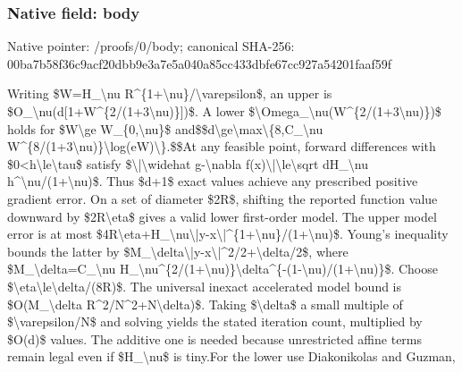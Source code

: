 \documentclass[10pt,a4paper]{article}
\begin{document}
\subsubsection{Native field: body}
Native pointer: /proofs/0/body; canonical SHA-256: 00ba7b58f36c9acf20dbb9e3a7e5a040a85cc433dbfe67cc927a54201faaf59f

\begingroup\raggedright\sloppy Writing \$W=\allowbreak{}H\_\allowbreak{}\textbackslash{}nu R\textasciicircum{}\{1+\textbackslash{}nu\}/\allowbreak{}\textbackslash{}varepsilon\$,\allowbreak{} an upper is \$O\_\allowbreak{}\textbackslash{}nu(d[1+W\textasciicircum{}\{2/\allowbreak{}(1+3\textbackslash{}nu)\}])\$. A lower \$\textbackslash{}Omega\_\allowbreak{}\textbackslash{}nu(W\textasciicircum{}\{2/\allowbreak{}(1+3\textbackslash{}nu)\})\$ holds for \$W\textbackslash{}ge W\_\allowbreak{}\{0,\allowbreak{}\textbackslash{}nu\}\$ and\newline{}\$\$d\textbackslash{}ge\textbackslash{}max\textbackslash{}\{8,\allowbreak{}C\_\allowbreak{}\textbackslash{}nu W\textasciicircum{}\{8/\allowbreak{}(1+3\textbackslash{}nu)\}\textbackslash{}log(eW)\textbackslash{}\}.\$\$\newline{}\newline{}At any feasible point,\allowbreak{} forward differences with \$0<h\textbackslash{}le\textbackslash{}tau\$ satisfy \$\textbackslash{}|\textbackslash{}widehat g-\textbackslash{}nabla f(x)\textbackslash{}|\textbackslash{}le\textbackslash{}sqrt dH\_\allowbreak{}\textbackslash{}nu h\textasciicircum{}\textbackslash{}nu/\allowbreak{}(1+\textbackslash{}nu)\$. Thus \$d+1\$ exact values achieve any prescribed positive gradient error. On a set of diameter \$2R\$,\allowbreak{} shifting the reported function value downward by \$2R\textbackslash{}eta\$ gives a valid lower first-order model. The upper model error is at most \$4R\textbackslash{}eta+H\_\allowbreak{}\textbackslash{}nu\textbackslash{}|y-x\textbackslash{}|\textasciicircum{}\{1+\textbackslash{}nu\}/\allowbreak{}(1+\textbackslash{}nu)\$. Young's inequality bounds the latter by \$M\_\allowbreak{}\textbackslash{}delta\textbackslash{}|y-x\textbackslash{}|\textasciicircum{}2/\allowbreak{}2+\textbackslash{}delta/\allowbreak{}2\$,\allowbreak{} where \$M\_\allowbreak{}\textbackslash{}delta=\allowbreak{}C\_\allowbreak{}\textbackslash{}nu H\_\allowbreak{}\textbackslash{}nu\textasciicircum{}\{2/\allowbreak{}(1+\textbackslash{}nu)\}\textbackslash{}delta\textasciicircum{}\{-(1-\textbackslash{}nu)/\allowbreak{}(1+\textbackslash{}nu)\}\$. Choose \$\textbackslash{}eta\textbackslash{}le\textbackslash{}delta/\allowbreak{}(8R)\$. The universal inexact accelerated model bound is \$O(M\_\allowbreak{}\textbackslash{}delta R\textasciicircum{}2/\allowbreak{}N\textasciicircum{}2+N\textbackslash{}delta)\$. Taking \$\textbackslash{}delta\$ a small multiple of \$\textbackslash{}varepsilon/\allowbreak{}N\$ and solving yields the stated iteration count,\allowbreak{} multiplied by \$O(d)\$ values. The additive one is needed because unrestricted affine terms remain legal even if \$H\_\allowbreak{}\textbackslash{}nu\$ is tiny.\newline{}\newline{}For the lower use Diakonikolas and Guzman,\allowbreak{} 
\end{document}
